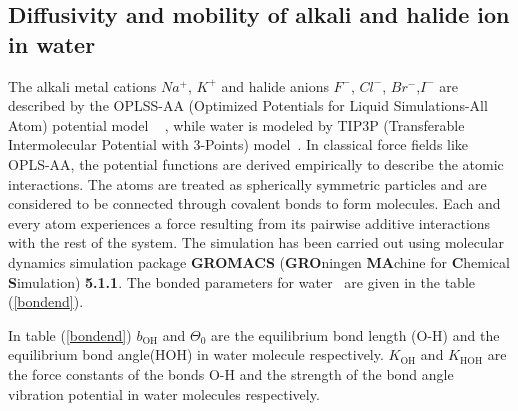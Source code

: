 \subsection{Diffusivity and mobility of alkali and halide ion in water}
\label{halide_diffusion}
\begin{sloppypar}
The alkali metal cations $Na^+$, $K^+$  and
halide anions $F^-$, $Cl^-$, $Br^-$,$I^-$  are described by the OPLSS-AA (Optimized Potentials for Liquid Simulations-All Atom) potential model ~ \citep{kaminski2001evaluation}, while water is modeled by
TIP3P (Transferable Intermolecular Potential with 3-Points) model~\citep{jorgensen1983comparison}. In classical force fields like OPLS-AA, the potential functions are derived empirically to describe the atomic interactions. The atoms are treated as spherically symmetric particles and are considered to be connected through covalent bonds to form molecules. Each and every atom experiences
a force resulting from its pairwise additive interactions with the rest of the system. The simulation has been carried out using molecular dynamics simulation package \textbf{GROMACS} (\textbf{GRO}ningen \textbf{MA}chine for \textbf{C}hemical \textbf{S}imulation) \textbf{5.1.1}. 
 The bonded parameters for water~\citep{jorgensen1983comparison} are given in the table (\ref{bondend}).
\begin{table}[H]
\centering
\caption [Force-field (bonded) parameters for for TIP3P water.]{Force-field (bonded) parameters for TIP3P water.}
\label{bondend}
\end{table}
 In table (\ref{bondend})  $b_{\mathrm{OH}}$  and $\Theta_0$ are the equilibrium bond length (O-H) and  the equilibrium bond angle(HOH) in water molecule respectively.  $K_{\mathrm{OH}}$  and $K_{\mathrm{HOH}}$ are the force constants of the bonds  O-H  and the strength of the bond angle vibration potential in water molecules  respectively. 
 

\end{sloppypar}
